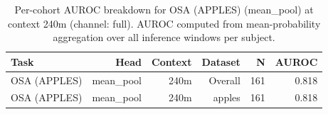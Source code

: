 \begin{table}[ht]
\centering
\caption{Per-cohort AUROC breakdown for OSA (APPLES) (mean_pool) at context 240m (channel: full). AUROC computed from mean-probability aggregation over all inference windows per subject.}
\label{tab:cohort_osa_binary_apples_postqc_mean_pool_full}
\begin{tabular}{lrrrrr}
\toprule
Task & Head & Context & Dataset & N & AUROC \\
\midrule
OSA (APPLES) & mean_pool & 240m & Overall & 161 & 0.818 \\
OSA (APPLES) & mean_pool & 240m & apples & 161 & 0.818 \\
\bottomrule
\end{tabular}
\end{table}